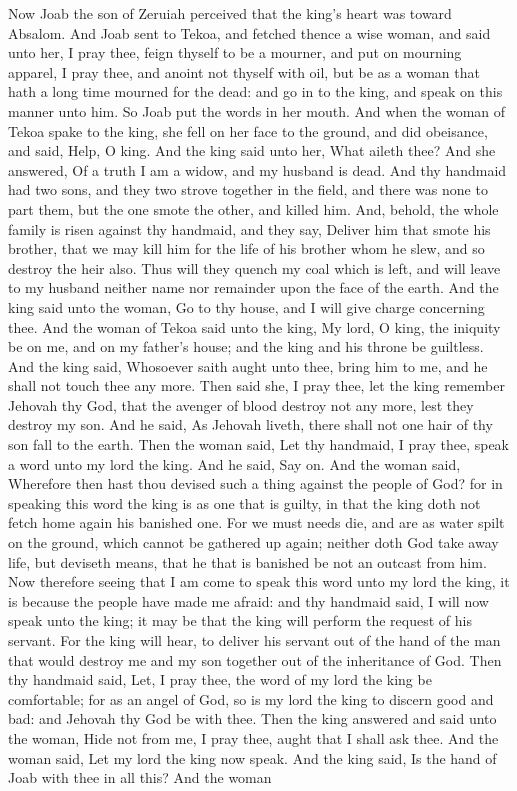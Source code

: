 Now Joab the son of Zeruiah perceived that the king’s heart was toward Absalom. And Joab sent to Tekoa, and fetched thence a wise woman, and said unto her, I pray thee, feign thyself to be a mourner, and put on mourning apparel, I pray thee, and anoint not thyself with oil, but be as a woman that hath a long time mourned for the dead: and go in to the king, and speak on this manner unto him. So Joab put the words in her mouth.  And when the woman of Tekoa spake to the king, she fell on her face to the ground, and did obeisance, and said, Help, O king. And the king said unto her, What aileth thee? And she answered, Of a truth I am a widow, and my husband is dead. And thy handmaid had two sons, and they two strove together in the field, and there was none to part them, but the one smote the other, and killed him. And, behold, the whole family is risen against thy handmaid, and they say, Deliver him that smote his brother, that we may kill him for the life of his brother whom he slew, and so destroy the heir also. Thus will they quench my coal which is left, and will leave to my husband neither name nor remainder upon the face of the earth.  And the king said unto the woman, Go to thy house, and I will give charge concerning thee. And the woman of Tekoa said unto the king, My lord, O king, the iniquity be on me, and on my father’s house; and the king and his throne be guiltless. And the king said, Whosoever saith aught unto thee, bring him to me, and he shall not touch thee any more. Then said she, I pray thee, let the king remember Jehovah thy God, that the avenger of blood destroy not any more, lest they destroy my son. And he said, As Jehovah liveth, there shall not one hair of thy son fall to the earth.  Then the woman said, Let thy handmaid, I pray thee, speak a word unto my lord the king. And he said, Say on. And the woman said, Wherefore then hast thou devised such a thing against the people of God? for in speaking this word the king is as one that is guilty, in that the king doth not fetch home again his banished one. For we must needs die, and are as water spilt on the ground, which cannot be gathered up again; neither doth God take away life, but deviseth means, that he that is banished be not an outcast from him. Now therefore seeing that I am come to speak this word unto my lord the king, it is because the people have made me afraid: and thy handmaid said, I will now speak unto the king; it may be that the king will perform the request of his servant. For the king will hear, to deliver his servant out of the hand of the man that would destroy me and my son together out of the inheritance of God. Then thy handmaid said, Let, I pray thee, the word of my lord the king be comfortable; for as an angel of God, so is my lord the king to discern good and bad: and Jehovah thy God be with thee.  Then the king answered and said unto the woman, Hide not from me, I pray thee, aught that I shall ask thee. And the woman said, Let my lord the king now speak. And the king said, Is the hand of Joab with thee in all this? And the woman 
